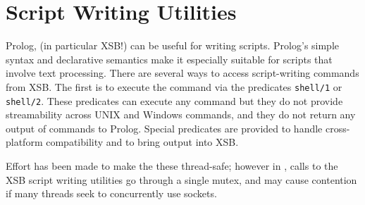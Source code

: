 
\section{Script Writing Utilities}

Prolog, (in particular XSB!) can be useful for writing scripts.
Prolog's simple syntax and declarative semantics make it especially
suitable for scripts that involve text processing.  There are several
ways to access script-writing commands from XSB.  The first is to
execute the command via the predicates {\tt shell/1} or {\tt shell/2}.
These predicates can execute any command but they do not provide
streamability across UNIX and Windows commands, and they do not return
any output of commands to Prolog.  Special predicates are provided to
handle cross-platform compatibility and to bring output into XSB.

Effort has been made to make the these thread-safe; however in
\version, calls to the XSB script writing utilities go through a
single mutex, and may cause contention if many threads seek to
concurrently use sockets.

